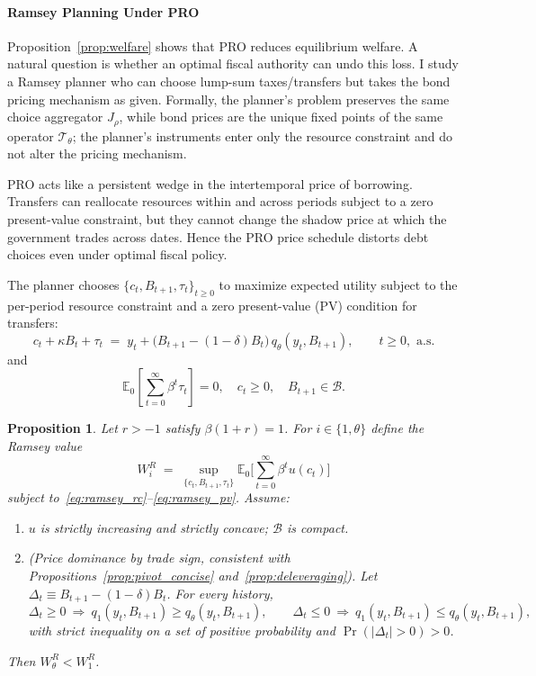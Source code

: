 \documentclass[12pt]{article}
\theoremstyle{plain}
\newtheorem{proposition}{Proposition}
\newcommand{\E}{\mathbb{E}}
\begin{document}
\paragraph{Ramsey Planning Under PRO}\label{sec:ramsey}
Proposition~\ref{prop:welfare} shows that PRO reduces equilibrium welfare. A
natural question is whether an optimal fiscal authority can undo this loss. I
study a Ramsey planner who can choose lump-sum taxes/transfers but takes the
bond pricing mechanism as given. Formally, the planner's problem preserves the
same choice aggregator $J_\rho$, while bond prices are the unique fixed points
of the same operator $\mathcal T_\theta$; the planner's instruments enter only
the resource constraint and do not alter the pricing mechanism.

PRO acts like a persistent wedge in the intertemporal price of borrowing.
Transfers can reallocate resources within and across periods subject to a zero
present-value constraint, but they cannot change the shadow price at which the
government trades across dates. Hence the PRO price schedule distorts debt
choices even under optimal fiscal policy.

The planner chooses $\{c_t,B_{t+1},\tau_t\}_{t\ge0}$ to maximize expected
utility subject to the per-period resource constraint and a zero present-value
(PV) condition for transfers:
\begin{equation}
	c_t+\kappa B_t+\tau_t \;=\; y_t+\bigl(B_{t+1}-(1-\delta)B_t\bigr)\,q_\theta(y_t,B_{t+1}),
	\qquad t\ge0, \text{ a.s.}
	\label{eq:ramsey_rc}
\end{equation}
and
\begin{equation}
	\E_0\!\left[\sum_{t=0}^\infty \beta^t \tau_t\right]=0,
	\quad c_t\ge0,
	\quad B_{t+1}\in\mathcal B.
	\label{eq:ramsey_pv}
\end{equation}

\begin{proposition}
	\label{prop:ramsey_welfare}
	Let $r>-1$ satisfy $\beta(1+r)=1$. For $i\in\{1,\theta\}$ define the Ramsey value
	\[
		W^R_i \;=\; \sup_{\{c_t,B_{t+1},\tau_t\}}\E_0\!\Big[\sum_{t=0}^\infty \beta^t u(c_t)\Big]
	\]
	subject to~\eqref{eq:ramsey_rc}--\eqref{eq:ramsey_pv}. Assume:
	\begin{enumerate}
		\item[(A1)] $u$ is strictly increasing and strictly concave; $\mathcal B$ is compact.
		\item[(A2)] (Price dominance by trade sign, consistent with Propositions~\ref{prop:pivot_concise} and~\ref{prop:deleveraging}). Let $\Delta_t\equiv B_{t+1}-(1-\delta)B_t$. For every history,
		      \[
			      \Delta_t\ge0 \ \Rightarrow\ q_1(y_t,B_{t+1})\ge q_\theta(y_t,B_{t+1}),\qquad
			      \Delta_t\le0 \ \Rightarrow\ q_1(y_t,B_{t+1})\le q_\theta(y_t,B_{t+1}),
		      \]
		      with strict inequality on a set of positive probability and
		      $\Pr(|\Delta_t|>0)>0$.
	\end{enumerate}
	Then $W^R_\theta<W^R_1$.
\end{proposition}
\end{document}
